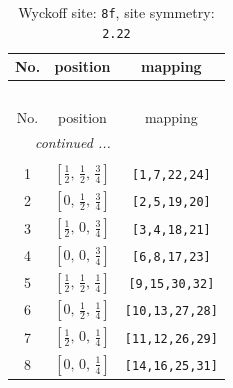 \documentclass[fleqn,8pt]{jsarticle}
\begin{document}
\begin{longtable}{ccc}
\caption{Wyckoff site: {\tt 8f}, site symmetry: {\tt 2.22}}
 \\
 \hline \hline
No. & position & mapping \\ \hline \endfirsthead

\multicolumn{2}{l}{\tablename\ \thetable{}} \\
 \hline \hline
No. & position & mapping \\ \hline \endhead

 \hline \hline
\multicolumn{2}{r}{\footnotesize\it continued ...} \\ \endfoot

 \hline \hline
\multicolumn{2}{r}{} \\ \endlastfoot

1 & $\left[ \frac{1}{2},\, \frac{1}{2},\, \frac{3}{4} \right]$ & {\tt [1,7,22,24]} \\ \hline
2 & $\left[ 0,\, \frac{1}{2},\, \frac{3}{4} \right]$ & {\tt [2,5,19,20]} \\ \hline
3 & $\left[ \frac{1}{2},\, 0,\, \frac{3}{4} \right]$ & {\tt [3,4,18,21]} \\ \hline
4 & $\left[ 0,\, 0,\, \frac{3}{4} \right]$ & {\tt [6,8,17,23]} \\ \hline
5 & $\left[ \frac{1}{2},\, \frac{1}{2},\, \frac{1}{4} \right]$ & {\tt [9,15,30,32]} \\ \hline
6 & $\left[ 0,\, \frac{1}{2},\, \frac{1}{4} \right]$ & {\tt [10,13,27,28]} \\ \hline
7 & $\left[ \frac{1}{2},\, 0,\, \frac{1}{4} \right]$ & {\tt [11,12,26,29]} \\ \hline
8 & $\left[ 0,\, 0,\, \frac{1}{4} \right]$ & {\tt [14,16,25,31]} \\
\end{longtable}
\renewcommand{\arraystretch}{1.2}
\end{document}
